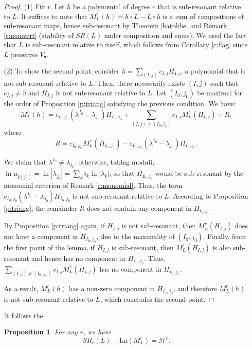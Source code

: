 \documentclass[english,11pt]{amsart}
\newtheorem{proposition}[theorem]{Proposition}
\theoremstyle{definition}
\theoremstyle{remark}
\numberwithin{equation}{section}
\begin{document}
\begin{proof}
(1) Fix $r$. Let $h$ be a polynomial of degree $r$ that is sub-resonant relative to $L$. It suffices to note that $M_L^r(h) = h \circ L - L \circ h$ is a sum of compositions of sub-resonant maps, hence sub-resonant by Theorem \ref{katoklie} and Remark \ref{r:noinvert} (stability of $SR(L)$ under composition and sums). We used the fact that $L$ is sub-resonant relative to itself, which follows from Corollary \ref{c:flag} since $L$ preserves $V_\bullet$.

(2) To show the second point, consider $h = \sum_{(I,j)} c_{I,j} H_{I,j}$, a polynomial that is not sub-resonant relative to $L$. Then, there necessarily exists $(I,j)$ such that $c_{I,j} \neq 0$ and $H_{I,j}$ is not sub-resonant relative to $L$. Let $(I_0, j_0)$ be maximal for the order of Proposition \ref{p:triang} satisfying the previous condition. We have:
\[
M_L^r(h) = c_{I_0, j_0} (\lambda^{I_0} - \lambda_{j_0}) H_{I_0, j_0} + \sum_{(I,j) \neq (I_0, j_0)} c_{I,j} M_L^r(H_{I,j}) + R,
\]
where
\[
R = c_{I_0, j_0} M_L^r(H_{I_0, j_0}) - c_{I_0, j_0} (\lambda^{I_0} - \lambda_{j_0}) H_{I_0, j_0}.
\]

We claim that $\lambda^{I_0} \neq \lambda_{j_0}$: otherwise, taking moduli, $\ln\mu_{b(j_0)}=\ln|\lambda_{j_0}|=\sum_k i_k\ln|\lambda_k|$, so that $H_{I_0,j_0}$ would be sub-resonant by the monomial criterion of Remark \ref{r:monomial}. Thus, the term $c_{I_0, j_0} (\lambda^{I_0} - \lambda_{j_0}) H_{I_0, j_0}$ is not sub-resonant relative to $L$. According to Proposition \ref{p:triang}, the remainder $R$ does not contain any component in $H_{I_0, j_0}$.

By Proposition \ref{p:triang} again, if $H_{I,j}$ is not sub-resonant, then $M_L^r(H_{I,j})$ does not have a component in $H_{I_0, j_0}$, due to the maximality of $(I_0, j_0)$. Finally, from the first point of the lemma, if $H_{I,j}$ is sub-resonant, then $M_L^r(H_{I,j})$ is also sub-resonant and hence has no component in $H_{I_0, j_0}$. Thus, $\sum_{(I,j) \neq (I_0,j_0)} c_{I,j} M_L^r(H_{I,j})$ has no component in $H_{I_0, j_0}$.

As a result, $M_L^r(h)$ has a non-zero component in $H_{I_0, j_0}$, and therefore $M_L^r(h)$ is not sub-resonant relative to $L$, which concludes the second point.

\end{proof}

It follows the
\begin{proposition}\label{p:surj}
For any $r$, we have
\[
SR_r(L) + \mathrm{Im}(M_L^r) = \mathcal{H}^r.
\]
\end{proposition}
\end{document}
